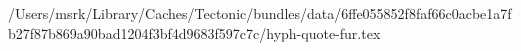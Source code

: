 /Users/msrk/Library/Caches/Tectonic/bundles/data/6ffe055852f8faf66c0acbe1a7fb27f87b869a90bad1204f3bf4d9683f597c7c/hyph-quote-fur.tex
